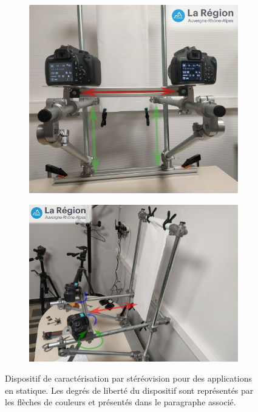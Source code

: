 \documentclass[a4paper, 11pt]{article}
\begin{document}
		\begin{figure}\centering
			\begin{subfigure}[b]{.43\linewidth}
				\includegraphics[width=\linewidth]{dispositif_statique_01.jpg}
				\caption{}
			\end{subfigure}
			\begin{subfigure}[b]{.52\linewidth}
				\includegraphics[width=\linewidth]{dispositif_statique_02.jpg}
				\caption{}
			\end{subfigure}
		\caption{\label{fig:dispositif_statique}Dispositif de caractérisation par stéréovision pour des applications en statique. Les degrés de liberté du dispositif sont représentés par les flèches de couleurs et présentés dans le paragraphe associé.}
		\end{figure}
\end{document}

